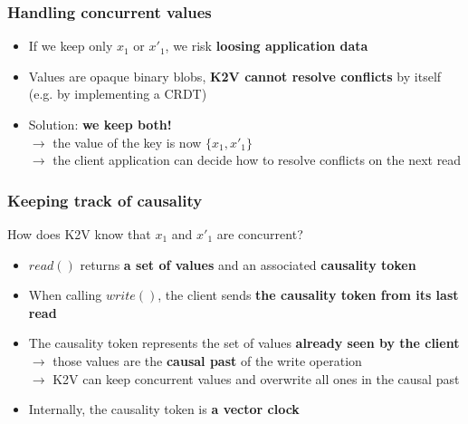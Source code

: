 \documentclass[aspectratio=169]{beamer}
\begin{document}
\begin{frame}
	\frametitle{Handling concurrent values}
	\begin{itemize}
		\item If we keep only $x_1$ or $x'_1$, we risk \textbf{loosing application data}
			\vspace{1.5em}
		\item<2-> Values are opaque binary blobs, \textbf{K2V cannot resolve conflicts} by itself\\
			(e.g. by implementing a CRDT)
			\vspace{1.5em}
		\item<3-> Solution: \textbf{we keep both!}\\
			$\to$ the value of the key is now $\{x_1, x'_1\}$\\
			$\to$ the client application can decide how to resolve conflicts on the next read
	\end{itemize}
\end{frame}

\begin{frame}
	\frametitle{Keeping track of causality}
	How does K2V know that $x_1$ and $x'_1$ are concurrent?
	\vspace{1em}
	\begin{itemize}
		\item $read()$ returns \textbf{a set of values} and an associated \textbf{causality token}\\
			\vspace{1.5em}
		\item<2-> When calling $write()$, the client sends \textbf{the causality token from its last read}
			\vspace{1.5em}
		\item<3-> The causality token represents the set of values \textbf{already seen by the client}\\
			$\to$ those values are the \textbf{causal past} of the write operation\\
			$\to$ K2V can keep concurrent values and overwrite all ones in the causal past
			\vspace{1.5em}
		\item<4-> Internally, the causality token is \textbf{a vector clock}
	\end{itemize}
\end{frame}
\end{document}
